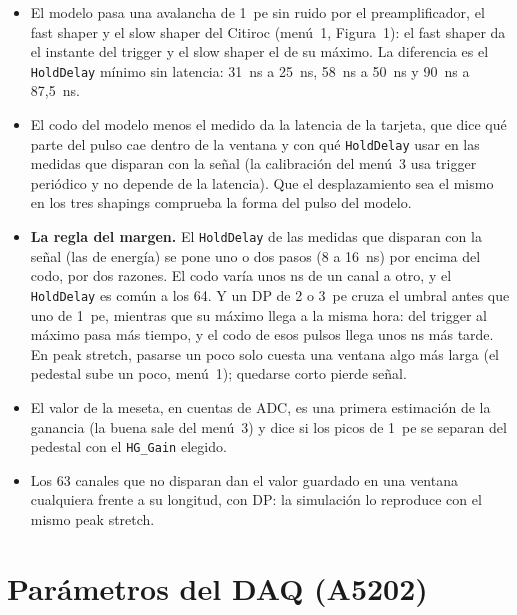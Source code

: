 \documentclass[11pt,a4paper]{article}
\begin{document}
\begin{itemize}
\item El modelo pasa una avalancha de 1~pe sin ruido por el preamplificador,
  el fast shaper y el slow shaper del Citiroc (menú~1, Figura~1): el fast
  shaper da el instante del trigger y el slow shaper el de su máximo. La
  diferencia es el \texttt{HoldDelay} mínimo sin latencia: 31~ns a 25~ns,
  58~ns a 50~ns y 90~ns a 87,5~ns.
\item El codo del modelo menos el medido da la latencia de la tarjeta, que
  dice qué parte del pulso cae dentro de la ventana y con qué
  \texttt{HoldDelay} usar en las medidas que disparan con la señal (la
  calibración del menú~3 usa trigger periódico y no depende de la
  latencia). Que el desplazamiento sea el mismo en los tres shapings
  comprueba la forma del pulso del modelo.
\item {\bf La regla del margen.} El \texttt{HoldDelay} de las medidas que
  disparan con la señal (las de energía) se pone uno o dos pasos (8 a 16~ns) por encima del codo, por dos
  razones. El codo varía unos ns de un canal a otro, y el
  \texttt{HoldDelay} es común a los 64. Y un DP de 2 o 3~pe cruza el umbral
  antes que uno de 1~pe, mientras que su máximo llega a la misma hora: del
  trigger al máximo pasa más tiempo, y el codo de esos pulsos llega unos ns
  más tarde. En peak stretch, pasarse un poco solo cuesta una ventana algo
  más larga (el pedestal sube un poco, menú~1); quedarse corto pierde señal.
\item El valor de la meseta, en cuentas de ADC, es una primera estimación de
  la ganancia (la buena sale del menú~3) y dice si los picos de 1~pe se
  separan del pedestal con el \texttt{HG\_Gain} elegido.
\item Los 63 canales que no disparan dan el valor guardado en una ventana
  cualquiera frente a su longitud, con DP: la simulación lo reproduce con el
  mismo peak stretch.
\end{itemize}

\section{Parámetros del DAQ (A5202)}
\label{sec:janus}
\end{document}
